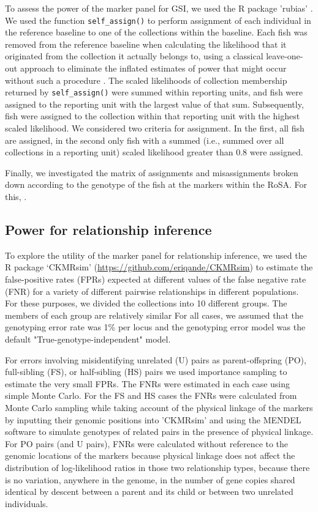 To assess the power of the marker panel for GSI, we used the R package
'rubias' \citep{moran2019bayesian}.  We used the function {\tt self\_assign()}
to perform assignment of each individual in the reference baseline to one of the
collections within the baseline.  Each fish was removed from the reference baseline
when calculating the likelihood that it originated from the collection it actually belongs
to, using a classical leave-one-out approach to eliminate the inflated estimates of
power that might occur without such a procedure \citep{anderson2008improved}.
The scaled likelihoods of collection membership returned by
{\tt self\_assign()} were summed within reporting units, and fish were
assigned to the reporting unit with the largest value of that sum.  Subsequently,
fish were assigned to the collection within that reporting unit with the highest
scaled likelihood.  We considered two criteria for assignment.  In the first,
all fish are assigned, in the second only fish with a summed (i.e., summed
over all collections in a reporting unit)
scaled likelihood greater than 0.8 were assigned.

Finally, we investigated the matrix of assignments and misassignments
broken down according to the genotype of the fish at the markers within
the RoSA.  For this, . 


\subsection*{Power for relationship inference}

To explore the utility of the marker panel for relationship inference, we used
the R package `CKMRsim'
(\url{https://github.com/eriqande/CKMRsim})
to estimate the false-positive rates (FPRs) expected at
different values of the false negative rate (FNR) for a variety of different pairwise
relationships in different populations.  For these purposes, we divided the
collections into 10 different groups.  The members of each group are
relatively similar For all cases, we assumed that the genotyping error rate
was 1\% per locus and the genotyping error model was the default
"True-genotype-independent" model. 

For errors involving misidentifying
unrelated (U) pairs as parent-offspring (PO), full-sibling (FS), or half-sibling (HS)
pairs we used importance sampling to estimate the very small FPRs.  The
FNRs were estimated in each case using simple Monte Carlo.  For the FS and
HS cases the FNRs were calculated from Monte Carlo sampling while taking account
of the physical linkage of the markers by inputting their genomic positions into
'CKMRsim' and using the MENDEL \citep{lange2013mendel} software to simulate genotypes of related pairs
in the presence of physical linkage.  For PO pairs (and U pairs),
FNRs were calculated without reference to the genomic locations of the markers
because physical linkage does not
affect the distribution of log-likelihood ratios in those two relationship types,
because there is no variation, anywhere
in the genome, in the number of gene copies shared identical by descent between
a parent and its child or between two unrelated individuals.

